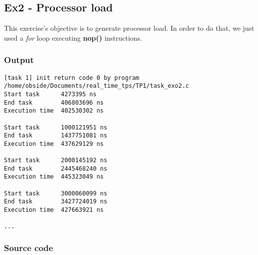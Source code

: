 \subsection{Ex2 - Processor load}
This exercise's objective is to generate processor load. In order to do that, we just used a \emph{for} loop executing \textbf{nop()} instructions.

\subsubsection{Output}
\begin{lstlisting}[keywordstyle=\color{black}]
[task 1] init return code 0 by program /home/obside/Documents/real_time_tps/TP1/task_exo2.c
Start task		4273395 ns
End task		406803696 ns
Execution time	402530302 ns

Start task		1000121951 ns
End task		1437751081 ns
Execution time	437629129 ns

Start task		2000145192 ns
End task		2445468240 ns
Execution time	445323049 ns

Start task		3000060099 ns
End task		3427724019 ns
Execution time	427663921 ns

...
\end{lstlisting}

\subsubsection{Source code}


